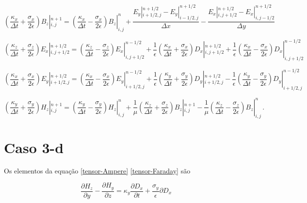 \documentclass[a4paper,10pt]{article}
\begin{document}
\begin{equation}
\left( \frac{\kappa_x}{\Delta t} + \frac{\sigma_x}{2 \epsilon} \right) B_z |_{i,j}^{n+1} = 
\left( \frac{\kappa_x}{\Delta t} - \frac{\sigma_x}{2 \epsilon} \right) B_z |_{i,j}^{n} +
\frac{E_y |_{i+1/2,j}^{n+1/2}-E_y |_{i-1/2,j}^{n+1/2}}{\Delta x}
-\frac{E_x |_{i,j+1/2}^{n+1/2}-E_x |_{i,j-1/2}^{n+1/2}}{\Delta y}\,
\end{equation}

\begin{equation}
\left( \frac{\kappa_z}{\Delta t} + \frac{\sigma_z}{2 \epsilon} \right) E_x |_{i,j+1/2}^{n+1/2} =
\left( \frac{\kappa_z}{\Delta t} - \frac{\sigma_z}{2 \epsilon} \right) E_x |_{i,j+1/2}^{n-1/2} +
\frac{1}{\epsilon} \left( \frac{\kappa_x}{\Delta t} + \frac{\sigma_x}{2 \epsilon} \right)  D_x |_{i,j+1/2}^{n+1/2} +
\frac{1}{\epsilon} \left( \frac{\kappa_x}{\Delta t} - \frac{\sigma_x}{2 \epsilon} \right)  D_x |_{i,j+1/2}^{n-1/2}\,
\end{equation}

\begin{equation}
\left( \frac{\kappa_x}{\Delta t} + \frac{\sigma_x}{2 \epsilon} \right) E_y |_{i+1/2,j}^{n+1/2} =
\left( \frac{\kappa_x}{\Delta t} - \frac{\sigma_x}{2 \epsilon} \right) E_y |_{i+1/2,j}^{n-1/2} +
\frac{1}{\epsilon} \left( \frac{\kappa_y}{\Delta t} + \frac{\sigma_y}{2 \epsilon} \right)  D_y |_{i+1/2,j}^{n+1/2} -
\frac{1}{\epsilon} \left( \frac{\kappa_y}{\Delta t} - \frac{\sigma_y}{2 \epsilon} \right)  D_y |_{i+1/2,j}^{n-1/2}\,
\end{equation}

\begin{equation}
\left( \frac{\kappa_y}{\Delta t} + \frac{\sigma_y}{2 \epsilon} \right) H_z |_{i,j}^{n+1} = 
\left( \frac{\kappa_y}{\Delta t} - \frac{\sigma_y}{2 \epsilon} \right) H_z |_{i,j}^{n} +
\frac{1}{\mu} \left( \frac{\kappa_z}{\Delta t} + \frac{\sigma_z}{2 \epsilon} \right) B_z |_{i,j}^{n+1} -
\frac{1}{\mu} \left( \frac{\kappa_z}{\Delta t} - \frac{\sigma_z}{2 \epsilon} \right) B_z |_{i,j}^{n}\,.
\end{equation}

\section{Caso 3-d}

Os elementos da equação \ref{tensor-Ampere} \ref{tensor-Faraday} são

\begin{equation}
 \dfrac{\partial H_z}{\partial y} - \dfrac{\partial H_y}{\partial z} = \kappa_y \dfrac{\partial D_x}{\partial t} + \frac{\sigma_y}{\epsilon} \partial D_x \label{pre-disc1}
\end{equation}
\end{document}
